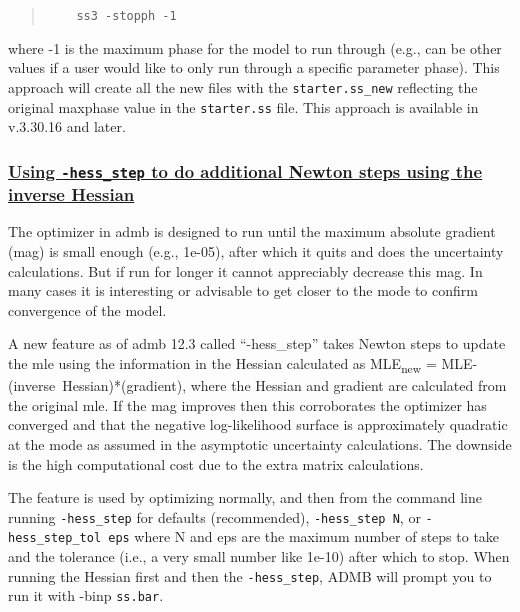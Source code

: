 \begin{quote}
	\begin{verbatim}
	ss3 -stopph -1
	\end{verbatim}
\end{quote}  

where -1 is the maximum phase for the model to run through (e.g., can be other values if a user would like to only run through a specific parameter phase). This approach will create all the new files with the \texttt{starter.ss\_new} reflecting the original maxphase value in the \texttt{starter.ss} file. This approach is available in v.3.30.16 and later.

\hypertarget{hess-step}{}
\subsubsection[Using \texttt{-hess\_step} to do additional Newton steps using the inverse Hessian]{\protect\hyperlink{hess-step}{Using \texttt{-hess\_step} to do additional Newton steps using the inverse Hessian}}

The optimizer in \gls{admb} is designed to run until the maximum absolute gradient (mag) is small enough (e.g., 1e-05), after which it quits and does the uncertainty calculations. But if run for longer it cannot appreciably decrease this mag. In many cases it is interesting or advisable to get closer to the mode to confirm convergence of the model. 

A new feature as of \gls{admb} 12.3 called ``-hess\_step'' takes Newton steps to update the \gls{mle} using the information in the Hessian calculated as MLE\textsubscript{new} = MLE-(inverse~Hessian)*(gradient), where the Hessian and gradient are calculated from the original \gls{mle}. If the mag improves then this corroborates the optimizer has converged and that the negative log-likelihood surface is approximately quadratic at the mode as assumed in the asymptotic uncertainty calculations. The downside is the high computational cost due to the extra matrix calculations.

The feature is used by optimizing normally, and then from the command line running \texttt{-hess\_step} for defaults (recommended), \texttt{-hess\_step N}, or \texttt{-hess\_step\_tol eps} where N and eps are the maximum number of steps to take and the tolerance (i.e., a very small number like 1e-10) after which to stop. When running the Hessian first and then the \texttt{-hess\_step}, ADMB will prompt you to run it with -binp \texttt{ss.bar}.

